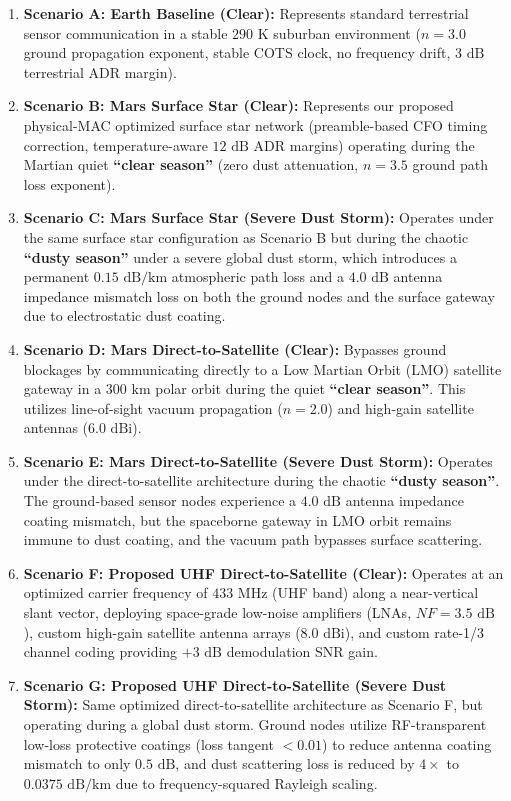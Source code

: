 \documentclass{ijuc}
\begin{document}
\begin{enumerate}
    \item \textbf{Scenario A: Earth Baseline (Clear):} Represents standard terrestrial sensor communication in a stable $290\text{ K}$ suburban environment ($n = 3.0$ ground propagation exponent, stable COTS clock, no frequency drift, $3\text{ dB}$ terrestrial ADR margin).
    \item \textbf{Scenario B: Mars Surface Star (Clear):} Represents our proposed physical-MAC optimized surface star network (preamble-based CFO timing correction, temperature-aware $12\text{ dB}$ ADR margins) operating during the Martian quiet \textbf{``clear season''} (zero dust attenuation, $n = 3.5$ ground path loss exponent).
    \item \textbf{Scenario C: Mars Surface Star (Severe Dust Storm):} Operates under the same surface star configuration as Scenario B but during the chaotic \textbf{``dusty season''} under a severe global dust storm, which introduces a permanent $0.15\text{ dB/km}$ atmospheric path loss and a $4.0\text{ dB}$ antenna impedance mismatch loss on both the ground nodes and the surface gateway due to electrostatic dust coating.
    \item \textbf{Scenario D: Mars Direct-to-Satellite (Clear):} Bypasses ground blockages by communicating directly to a Low Martian Orbit (LMO) satellite gateway in a $300\text{ km}$ polar orbit during the quiet \textbf{``clear season''}. This utilizes line-of-sight vacuum propagation ($n=2.0$) and high-gain satellite antennas ($6.0\text{ dBi}$).
    \item \textbf{Scenario E: Mars Direct-to-Satellite (Severe Dust Storm):} Operates under the direct-to-satellite architecture during the chaotic \textbf{``dusty season''}. The ground-based sensor nodes experience a $4.0\text{ dB}$ antenna impedance coating mismatch, but the spaceborne gateway in LMO orbit remains immune to dust coating, and the vacuum path bypasses surface scattering.
    \item \textbf{Scenario F: Proposed UHF Direct-to-Satellite (Clear):} Operates at an optimized carrier frequency of $433\text{ MHz}$ (UHF band) along a near-vertical slant vector, deploying space-grade low-noise amplifiers (LNAs, $NF=3.5\text{ dB}$), custom high-gain satellite antenna arrays ($8.0\text{ dBi}$), and custom rate-1/3 channel coding providing $+3\text{ dB}$ demodulation SNR gain.
    \item \textbf{Scenario G: Proposed UHF Direct-to-Satellite (Severe Dust Storm):} Same optimized direct-to-satellite architecture as Scenario F, but operating during a global dust storm. Ground nodes utilize RF-transparent low-loss protective coatings (loss tangent $< 0.01$) to reduce antenna coating mismatch to only $0.5\text{ dB}$, and dust scattering loss is reduced by $4\times$ to $0.0375\text{ dB/km}$ due to frequency-squared Rayleigh scaling.

\end{enumerate}
\end{document}
